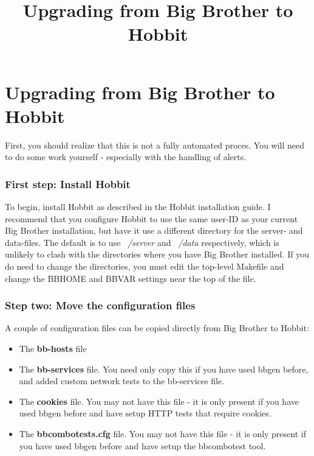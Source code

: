 \title{Upgrading from Big Brother to Hobbit}
\section{Upgrading from Big Brother to Hobbit}


 First, you should realize that this is not a fully automated
 proces. You will need to do some work yourself - especially with the
 handling of alerts.

\subsubsection{First step: Install Hobbit}


 To begin, install Hobbit as described in the Hobbit installation
 guide. I recommend that you configure Hobbit to use the same user-ID
 as your current Big Brother installation, but have it use a different
 directory for the server- and data-files. The default is to use
 \emph{~/server} and \emph{~/data} respectively, which is unlikely to
 clash with the directories where you have Big Brother installed. If
 you do need to change the directories, you must edit the top-level
 Makefile and change the BBHOME and BBVAR settings near the top of the
 file.

\subsubsection{Step two: Move the configuration files}


 A couple of configuration files can be copied directly from Big
 Brother to Hobbit:

\begin{itemize}

\item The \textbf{bb-hosts}
 file 
\item The \textbf{bb-services} file. You need only copy this if you
have used bbgen before, and added custom network tests to the
bb-services file.
\item The \textbf{cookies} file. You may not have this file - it is
only present if you have used bbgen before and have setup HTTP tests
that require cookies.

\item The \textbf{bbcombotests.cfg} file. You may not have this file -
it is only present if you have used bbgen before and have setup the
bbcombotest tool.


\end{itemize}


